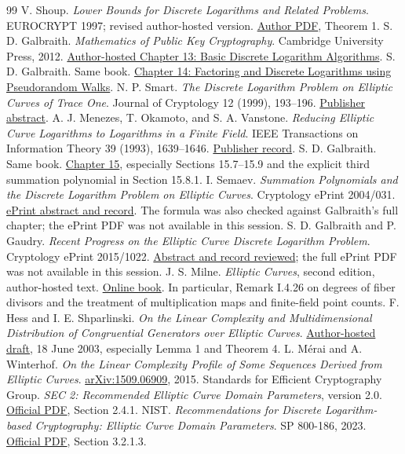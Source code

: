 \documentclass[11pt,letterpaper]{article}
\theoremstyle{definition}
\theoremstyle{remark}
\begin{document}
\begin{thebibliography}{99}\small
{} V. Shoup. \emph{Lower Bounds for Discrete Logarithms and Related Problems}. EUROCRYPT 1997; revised author-hosted version. \href{https://www.shoup.net/papers/dlbounds1.pdf}{Author PDF}, Theorem 1.
 S. D. Galbraith. \emph{Mathematics of Public Key Cryptography}. Cambridge University Press, 2012. \href{https://www.math.auckland.ac.nz/~sgal018/crypto-book/ch13.pdf}{Author-hosted Chapter 13: Basic Discrete Logarithm Algorithms}.
 S. D. Galbraith. Same book. \href{https://www.math.auckland.ac.nz/~sgal018/crypto-book/ch14.pdf}{Chapter 14: Factoring and Discrete Logarithms using Pseudorandom Walks}.
 N. P. Smart. \emph{The Discrete Logarithm Problem on Elliptic Curves of Trace One}. Journal of Cryptology 12 (1999), 193--196. \href{https://link.springer.com/article/10.1007/s001459900052}{Publisher abstract}.
 A. J. Menezes, T. Okamoto, and S. A. Vanstone. \emph{Reducing Elliptic Curve Logarithms to Logarithms in a Finite Field}. IEEE Transactions on Information Theory 39 (1993), 1639--1646. \href{https://ieeexplore.ieee.org/document/259647/}{Publisher record}.
 S. D. Galbraith. Same book. \href{https://www.math.auckland.ac.nz/~sgal018/crypto-book/ch15.pdf}{Chapter 15}, especially Sections 15.7--15.9 and the explicit third summation polynomial in Section 15.8.1.
 I. Semaev. \emph{Summation Polynomials and the Discrete Logarithm Problem on Elliptic Curves}. Cryptology ePrint 2004/031. \href{https://eprint.iacr.org/2004/031}{ePrint abstract and record}. The formula was also checked against Galbraith's full chapter; the ePrint PDF was not available in this session.
 S. D. Galbraith and P. Gaudry. \emph{Recent Progress on the Elliptic Curve Discrete Logarithm Problem}. Cryptology ePrint 2015/1022. \href{https://eprint.iacr.org/2015/1022}{Abstract and record reviewed}; the full ePrint PDF was not available in this session.
 J. S. Milne. \emph{Elliptic Curves}, second edition, author-hosted text. \href{https://www.jmilne.org/math/Books/EC2.pdf}{Online book}. In particular, Remark I.4.26 on degrees of fiber divisors and the treatment of multiplication maps and finite-field point counts.
 F. Hess and I. E. Shparlinski. \emph{On the Linear Complexity and Multidimensional Distribution of Congruential Generators over Elliptic Curves}. \href{https://uol.de/f/5/inst/mathe/personen/florian.hess/pdf/lincomplex.pdf}{Author-hosted draft}, 18 June 2003, especially Lemma 1 and Theorem 4.
 L. M\'erai and A. Winterhof. \emph{On the Linear Complexity Profile of Some Sequences Derived from Elliptic Curves}. \href{https://arxiv.org/abs/1509.06909}{arXiv:1509.06909}, 2015.
 Standards for Efficient Cryptography Group. \emph{SEC 2: Recommended Elliptic Curve Domain Parameters}, version 2.0. \href{https://www.secg.org/sec2-v2.pdf}{Official PDF}, Section 2.4.1.
 NIST. \emph{Recommendations for Discrete Logarithm-based Cryptography: Elliptic Curve Domain Parameters}. SP 800-186, 2023. \href{https://nvlpubs.nist.gov/nistpubs/SpecialPublications/NIST.SP.800-186.pdf}{Official PDF}, Section 3.2.1.3.
\end{thebibliography}
\end{document}
